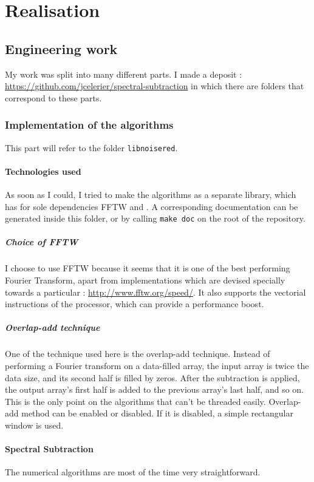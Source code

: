 \section{Realisation}
\subsection{Engineering work}
My work was split into many different parts. I made a  deposit : \url{https://github.com/jcelerier/spectral-subtraction} in which there are folders that correspond to these parts.
\subsubsection{Implementation of the algorithms}
This part will refer to the folder \texttt{libnoisered}. 

\paragraph{Technologies used}
As soon as I could, I tried to make the algorithms as a separate library, which has for sole dependencies \ac{FFTW} and . A corresponding  documentation can be generated inside this folder, or by calling \texttt{make doc} on the root of the repository.

\subparagraph{Choice of \ac{FFTW}} I choose to use \ac{FFTW} because it seems that it is one of the best performing Fourier Transform, apart from implementations which are devised specially towards a particular : \url{http://www.fftw.org/speed/}.
It also supports the  vectorial instructions of the  processor, which can provide a performance boost.
\subparagraph{Overlap-add technique}
One of the technique used here is the overlap-add technique. Instead of performing a Fourier transform on a data-filled array, the input array is twice the data size, and its second half is filled by zeros.
After the subtraction is applied, the output array's first half is added to the previous array's last half, and so on. This is the only point on the algorithms that can't be threaded easily.
Overlap-add method can be enabled or disabled. If it is disabled, a simple rectangular window is used.
\paragraph{Spectral Subtraction}
The numerical algorithms are most of the time very straightforward.


